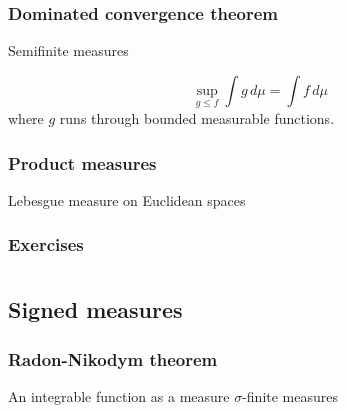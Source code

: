 \documentclass{../../large}
\begin{document}
\section{Dominated convergence theorem}


\begin{prb}
\end{prb}

\begin{prb}
Semifinite measures
\begin{parts}
\item
\[\sup_{g\le f}\int g\,d\mu=\int f\,d\mu\]
where $g$ runs through bounded measurable functions.
\item
\end{parts}
\end{prb}


\section{Product measures}

\begin{prb}
Lebesgue measure on Euclidean spaces
\end{prb}




\section*{Exercises}
\begin{prb}
\end{prb}



\part{}


\chapter{Signed measures}




\section{Radon-Nikodym theorem}

An integrable function as a measure
$\sigma$-finite measures
\end{document}
